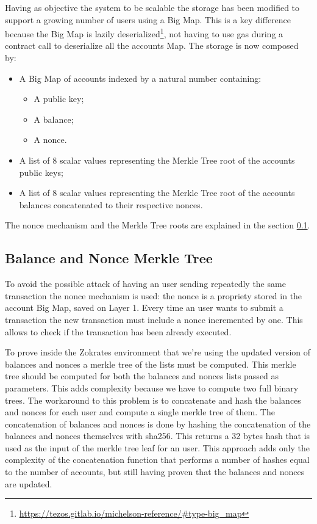 Having as objective the system to be scalable the storage has been modified to support a growing number of users using a Big Map. This is a key difference because the Big Map is lazily deserialized\footnote{\url{https://tezos.gitlab.io/michelson-reference/\#type-big_map}}, not having to use gas during a contract call to deserialize all the accounts Map. The storage is now composed by:
\begin{itemize}
	\item A Big Map of accounts indexed by a natural number containing:
		\begin{itemize}
			\item A public key;
			\item A balance;
			\item A nonce.
		\end{itemize}
	\item A list of 8 scalar values representing the Merkle Tree root of the accounts public keys;
	\item A list of 8 scalar values representing the Merkle Tree root of the accounts balances concatenated to their respective nonces.
\end{itemize}

The nonce mechanism and the Merkle Tree roots are explained in the section \ref{subsec:merkletreeBalanceNonce}.

\subsection{Balance and Nonce Merkle Tree}
\label{subsec:merkletreeBalanceNonce}

To avoid the possible attack of having an user sending repeatedly the same transaction the nonce mechanism is used: the nonce is a propriety stored in the account Big Map, saved on Layer 1. Every time an user wants to submit a transaction the new transaction must include a nonce incremented by one. This allows to check if the transaction has been already executed.

To prove inside the Zokrates environment that we're using the updated version of balances and nonces a merkle tree of the lists must be computed. This merkle tree should be computed for both the balances and nonces lists passed as parameters. This adds complexity because we have to compute two full binary trees. The workaround to this problem is to concatenate and hash the balances and nonces for each user and compute a single merkle tree of them. The concatenation of balances and nonces is done by hashing the concatenation of the balances and nonces themselves with sha256. This returns a 32 bytes hash that is used as the input of the merkle tree leaf for an user. This approach adds only the complexity of the concatenation function that performs a number of hashes equal to the number of accounts, but still having proven that the balances and nonces are updated.

